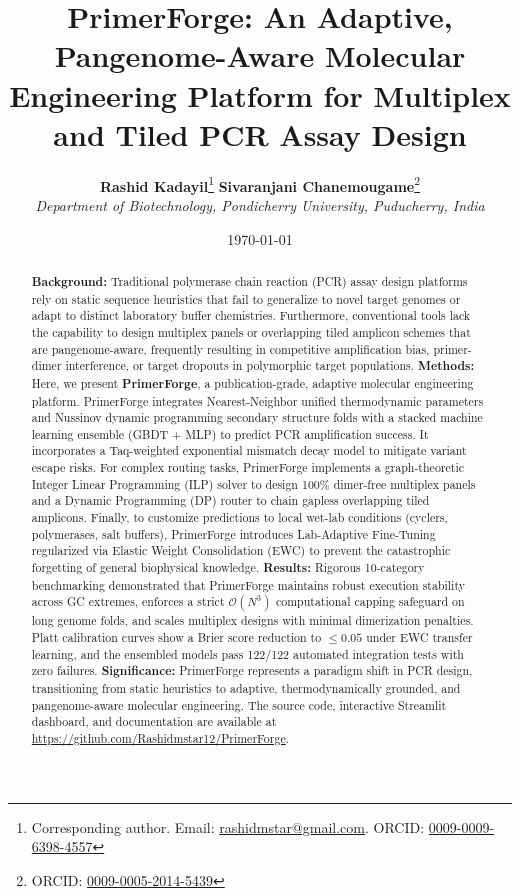 \documentclass[twocolumn,10pt]{article}
\title{\textbf{PrimerForge: An Adaptive, Pangenome-Aware Molecular Engineering Platform for Multiplex and Tiled PCR Assay Design}}
\author{
    \textbf{Rashid Kadayil}\thanks{Corresponding author. Email: \href{mailto:rashidmstar@gmail.com}{rashidmstar@gmail.com}. ORCID: \href{https://orcid.org/0009-0009-6398-4557}{0009-0009-6398-4557}} \quad \text{and} \quad \textbf{Sivaranjani Chanemougame}\thanks{ORCID: \href{https://orcid.org/0009-0005-2014-5439}{0009-0005-2014-5439}}\\
    \textit{Department of Biotechnology, Pondicherry University, Puducherry, India}
}
\date{\small \today}
\begin{document}
\maketitle

\begin{abstract}
\textbf{Background:} Traditional polymerase chain reaction (PCR) assay design platforms rely on static sequence heuristics that fail to generalize to novel target genomes or adapt to distinct laboratory buffer chemistries. Furthermore, conventional tools lack the capability to design multiplex panels or overlapping tiled amplicon schemes that are pangenome-aware, frequently resulting in competitive amplification bias, primer-dimer interference, or target dropouts in polymorphic target populations.  
\textbf{Methods:} Here, we present \textbf{PrimerForge}, a publication-grade, adaptive molecular engineering platform. PrimerForge integrates Nearest-Neighbor unified thermodynamic parameters and Nussinov dynamic programming secondary structure folds with a stacked machine learning ensemble (GBDT + MLP) to predict PCR amplification success. It incorporates a Taq-weighted exponential mismatch decay model to mitigate variant escape risks. For complex routing tasks, PrimerForge implements a graph-theoretic Integer Linear Programming (ILP) solver to design 100\% dimer-free multiplex panels and a Dynamic Programming (DP) router to chain gapless overlapping tiled amplicons. Finally, to customize predictions to local wet-lab conditions (cyclers, polymerases, salt buffers), PrimerForge introduces Lab-Adaptive Fine-Tuning regularized via Elastic Weight Consolidation (EWC) to prevent the catastrophic forgetting of general biophysical knowledge.  
\textbf{Results:} Rigorous 10-category benchmarking demonstrated that PrimerForge maintains robust execution stability across GC extremes, enforces a strict $\mathcal{O}(N^3)$ computational capping safeguard on long genome folds, and scales multiplex designs with minimal dimerization penalties. Platt calibration curves show a Brier score reduction to $\le 0.05$ under EWC transfer learning, and the ensembled models pass 122/122 automated integration tests with zero failures.  
\textbf{Significance:} PrimerForge represents a paradigm shift in PCR design, transitioning from static heuristics to adaptive, thermodynamically grounded, and pangenome-aware molecular engineering. The source code, interactive Streamlit dashboard, and documentation are available at \url{https://github.com/Rashidmstar12/PrimerForge}.
\end{abstract}
\end{document}
